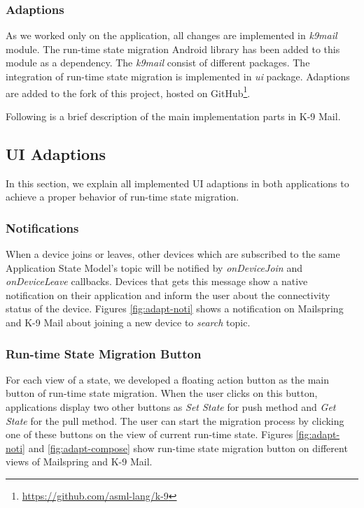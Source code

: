 \subsubsection{Adaptions}
As we worked only on the application, all changes are implemented in \textit{k9mail} module. The run-time state migration Android library has been added to this module as a dependency. The \textit{k9mail} consist of different packages. The integration of run-time state migration is implemented in \textit{ui} package. Adaptions are added to the fork of this project, hosted on GitHub\footnote{\url{https://github.com/asml-lang/k-9}}. 

Following is a brief description of the main implementation parts in K-9 Mail.


\subsection{UI Adaptions}
In this section, we explain all implemented UI adaptions in both applications to achieve a proper behavior of run-time state migration. 

\subsubsection{Notifications}
When a device joins or leaves, other devices which are subscribed to the same Application State Model's topic will be notified by \textit{onDeviceJoin} and \textit{onDeviceLeave} callbacks. Devices that gets this message show a native notification on their application and inform the user about the connectivity status of the device. Figures \ref{fig:adapt-noti} shows a notification on Mailspring and K-9 Mail about joining a new device to \textit{search} topic.

\subsubsection{Run-time State Migration Button}
For each view of a state, we developed a floating action button as the main button of run-time state migration. When the user clicks on this button, applications display two other buttons as \textit{Set State} for push method and \textit{Get State} for the pull method. The user can start the migration process by clicking one of these buttons on the view of current run-time state. Figures \ref{fig:adapt-noti} and \ref{fig:adapt-compose} show run-time state migration button on different views of Mailspring and K-9 Mail. 

